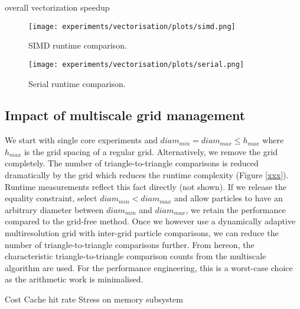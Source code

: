 overall vectorization speedup
\begin{figure}[htb]
  \begin{center}
    \texttt{[image: experiments/vectorisation/plots/simd.png]}
  \end{center}
  \caption{SIMD runtime comparison.}
  \label{figure:triangle_omp}
\end{figure}

\begin{figure}[htb]
  \begin{center}
    \texttt{[image: experiments/vectorisation/plots/serial.png]}
  \end{center}
  \caption{Serial runtime comparison.}
  \label{figure:triangle_omp}
\end{figure}


\clearpage

\subsection{Impact of multiscale grid management}

We start with single core experiments and $diam_{min} = diam_{max} \leq
h_{max}$ where $h_{max}$ is the grid spacing of a regular grid.
Alternatively, we remove the grid completely.
The number of triangle-to-triangle comparisons is reduced dramatically by the
grid which reduces the runtime complexity (Figure \ref{xxx}).
Runtime measurements reflect this fact directly (not shown).
If we release the equality constraint, select $diam_{min} < diam_{max}$ and
allow particles to have an arbitrary diameter between $diam_{min}$ and
$diam_{max}$, we retain the performance compared to the grid-free method.
Once we however use a dynamically adaptive multiresolution grid with inter-grid
particle comparisons, we can reduce the number of triangle-to-triangle
comparisons further. 
From hereon, the characteristic triangle-to-triangle comparison counts from the
multiscale algorithm are used.
For the performance engineering, this is a worst-case choice as the arithmetic
work is minimalised.



Cost
Cache hit rate
Stress on memory subsystem
